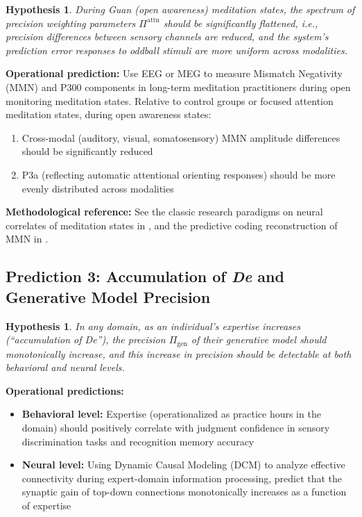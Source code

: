 \documentclass[11pt,a4paper]{article}
\newtheorem{hypothesis}[proposition]{Hypothesis}
\begin{document}
\begin{hypothesis}
During \textit{Guan} (open awareness) meditation states, the spectrum of precision weighting parameters $\Pi^{\text{attn}}$ should be significantly flattened, i.e., precision differences between sensory channels are reduced, and the system's prediction error responses to oddball stimuli are more uniform across modalities.
\end{hypothesis}

\textbf{Operational prediction:} Use EEG or MEG to measure Mismatch Negativity (MMN) and P300 components in long-term meditation practitioners during open monitoring meditation states. Relative to control groups or focused attention meditation states, during open awareness states:
\begin{enumerate}[nosep]
    \item Cross-modal (auditory, visual, somatosensory) MMN amplitude differences should be significantly reduced
    \item P3a (reflecting automatic attentional orienting responses) should be more evenly distributed across modalities
\end{enumerate}

\textbf{Methodological reference:} See the classic research paradigms on neural correlates of meditation states in \cite{Lutz2008,Lutz2009}, and the predictive coding reconstruction of MMN in \cite{Wacongne2011}.

\subsection{Prediction 3: Accumulation of \textit{De} and Generative Model Precision}

\begin{hypothesis}
In any domain, as an individual's expertise increases (``accumulation of \textit{De}''), the precision $\Pi_{\text{gen}}$ of their generative model should monotonically increase, and this increase in precision should be detectable at both behavioral and neural levels.
\end{hypothesis}

\textbf{Operational predictions:}
\begin{itemize}[nosep]
    \item \textbf{Behavioral level:} Expertise (operationalized as practice hours in the domain) should positively correlate with judgment confidence in sensory discrimination tasks and recognition memory accuracy
    \item \textbf{Neural level:} Using Dynamic Causal Modeling (DCM) to analyze effective connectivity during expert-domain information processing, predict that the synaptic gain of top-down connections monotonically increases as a function of expertise
\end{itemize}
\end{document}
